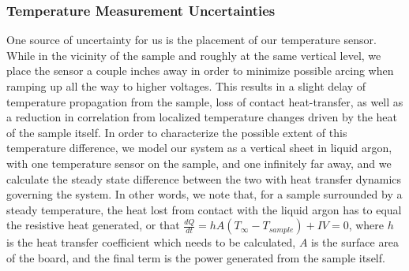 \documentclass[a4paper,12pt]{article}
\begin{document}
\subsubsection{Temperature Measurement Uncertainties}
One source of uncertainty for us is the placement of our temperature sensor. While in the vicinity of the sample and roughly at the same vertical level, we place the sensor a couple inches away in order to minimize possible arcing when ramping up all the way to higher voltages. This results in a slight delay of temperature propagation from the sample, loss of contact heat-transfer, as well as a reduction in correlation from localized temperature changes driven by the heat of the sample itself. In order to characterize the possible extent of this temperature difference, we model our system as a vertical sheet in liquid argon, with one temperature sensor on the sample, and one infinitely far away, and we calculate the steady state difference between the two with heat transfer dynamics governing the system. In other words, we note that, for a sample surrounded by a steady temperature, the heat lost from contact with the liquid argon has to equal the resistive heat generated, or that $\frac{dQ}{dt}=hA(T_{\infty}-T_{sample})+IV=0$, where $h$ is the heat transfer coefficient which needs to be calculated, $A$ is the surface area of the board, and the final term is the power generated from the sample itself.
\end{document}
